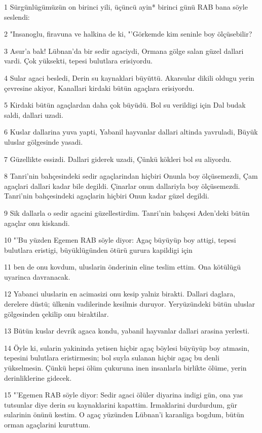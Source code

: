 \par 1 Sürgünlügümüzün on birinci yili, üçüncü ayin* birinci günü RAB bana söyle seslendi:
\par 2 "Insanoglu, firavuna ve halkina de ki, "'Görkemde kim seninle boy ölçüsebilir?
\par 3 Asur'a bak! Lübnan'da bir sedir agaciydi, Ormana gölge salan güzel dallari vardi. Çok yüksekti, tepesi bulutlara erisiyordu.
\par 4 Sular agaci besledi, Derin su kaynaklari büyüttü. Akarsular dikili oldugu yerin çevresine akiyor, Kanallari kirdaki bütün agaçlara erisiyordu.
\par 5 Kirdaki bütün agaçlardan daha çok büyüdü. Bol su verildigi için Dal budak saldi, dallari uzadi.
\par 6 Kuslar dallarina yuva yapti, Yabanil hayvanlar dallari altinda yavruladi, Büyük uluslar gölgesinde yasadi.
\par 7 Güzellikte essizdi. Dallari giderek uzadi, Çünkü kökleri bol su aliyordu.
\par 8 Tanri'nin bahçesindeki sedir agaçlarindan hiçbiri Onunla boy ölçüsemezdi, Çam agaçlari dallari kadar bile degildi. Çinarlar onun dallariyla boy ölçüsemezdi. Tanri'nin bahçesindeki agaçlarin hiçbiri Onun kadar güzel degildi.
\par 9 Sik dallarla o sedir agacini güzellestirdim. Tanri'nin bahçesi Aden'deki bütün agaçlar onu kiskandi.
\par 10 "'Bu yüzden Egemen RAB söyle diyor: Agaç büyüyüp boy attigi, tepesi bulutlara eristigi, büyüklügünden ötürü gurura kapildigi için
\par 11 ben de onu kovdum, uluslarin önderinin eline teslim ettim. Ona kötülügü uyarinca davranacak.
\par 12 Yabanci uluslarin en acimasizi onu kesip yalniz birakti. Dallari daglara, derelere düstü; ülkenin vadilerinde kesilmis duruyor. Yeryüzündeki bütün uluslar gölgesinden çekilip onu biraktilar.
\par 13 Bütün kuslar devrik agaca kondu, yabanil hayvanlar dallari arasina yerlesti.
\par 14 Öyle ki, sularin yakininda yetisen hiçbir agaç böylesi büyüyüp boy atmasin, tepesini bulutlara eristirmesin; bol suyla sulanan hiçbir agaç bu denli yükselmesin. Çünkü hepsi ölüm çukuruna inen insanlarla birlikte ölüme, yerin derinliklerine gidecek.
\par 15 "'Egemen RAB söyle diyor: Sedir agaci ölüler diyarina indigi gün, ona yas tutsunlar diye derin su kaynaklarini kapattim. Irmaklarini durdurdum, gür sularinin önünü kestim. O agaç yüzünden Lübnan'i karanliga bogdum, bütün orman agaçlarini kuruttum.
